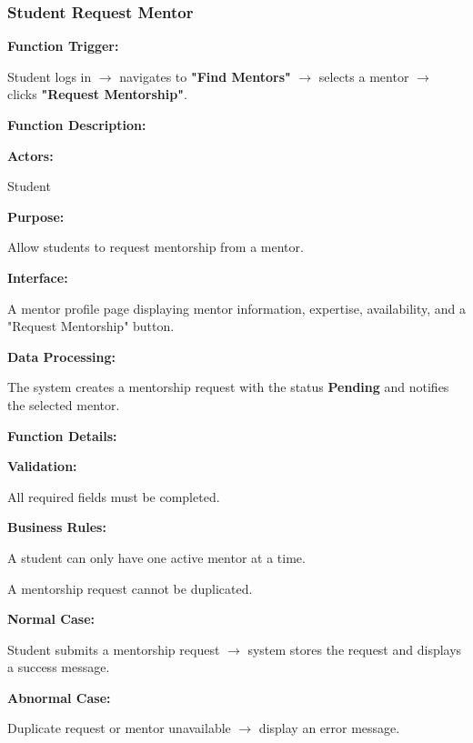 \subsubsection{Student Request Mentor}

\textbf{Function Trigger:}

Student logs in $\rightarrow$ navigates to \textbf{"Find Mentors"} $\rightarrow$ selects a mentor $\rightarrow$ clicks \textbf{"Request Mentorship"}.

\vspace{0.3cm}

\textbf{Function Description:}

\textbf{Actors:}

Student

\vspace{0.2cm}

\textbf{Purpose:}

Allow students to request mentorship from a mentor.

\vspace{0.2cm}

\textbf{Interface:}

A mentor profile page displaying mentor information, expertise, availability, and a "Request Mentorship" button.

\vspace{0.2cm}

\textbf{Data Processing:}

The system creates a mentorship request with the status \textbf{Pending} and notifies the selected mentor.

\vspace{0.3cm}

\textbf{Function Details:}

\textbf{Validation:}

All required fields must be completed.

\textbf{Business Rules:}

A student can only have one active mentor at a time.

A mentorship request cannot be duplicated.

\textbf{Normal Case:}

Student submits a mentorship request $\rightarrow$ system stores the request and displays a success message.

\textbf{Abnormal Case:}

Duplicate request or mentor unavailable $\rightarrow$ display an error message.


